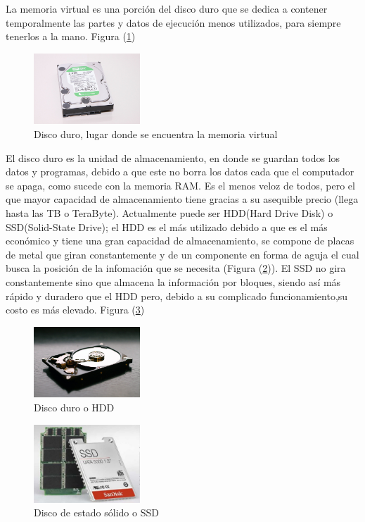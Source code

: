 \documentclass{article}
\begin{document}
La memoria virtual es una porción del disco duro que se dedica a contener temporalmente las partes y datos de ejecución menos utilizados, para siempre tenerlos a la mano.
Figura (\ref{fig:virtual})
\begin{figure}[h]
\includegraphics[width=4cm]{virtual.jpg}
\centering
\caption{Disco duro, lugar donde se encuentra la memoria virtual\cite{virtual}}
\label{fig:virtual}
\end{figure}\newline

El disco duro es la unidad de almacenamiento, en donde se guardan todos los datos y programas, debido a que este no borra los datos cada que el computador se apaga, como sucede con la memoria RAM. Es el menos veloz de todos, pero el que mayor capacidad de almacenamiento tiene gracias a su asequible precio (llega hasta las TB o TeraByte). Actualmente puede ser HDD(Hard Drive Disk) o SSD(Solid-State Drive); el HDD es el más utilizado debido a que es el más económico y tiene una gran capacidad de almacenamiento, se compone de placas de metal que giran constantemente y de un componente en forma de aguja el cual busca la posición de la infomación que se necesita (Figura (\ref{fig:HDD})). El SSD no gira constantemente sino que almacena la información por bloques, siendo así más rápido y duradero que el HDD pero, debido a su complicado funcionamiento,su costo es más elevado.
Figura (\ref{fig:SSD})\newline

\begin{figure}[h]
\includegraphics[width=4cm]{HDD.jpg}
\centering
\caption{Disco duro o HDD\cite{HDD}}
\label{fig:HDD}
\end{figure}

\begin{figure}[h]
\includegraphics[width=4cm]{SSD.jpg}
\centering
\caption{Disco de estado sólido o SSD\cite{SSD}}
\label{fig:SSD}
\end{figure}
\end{document}
